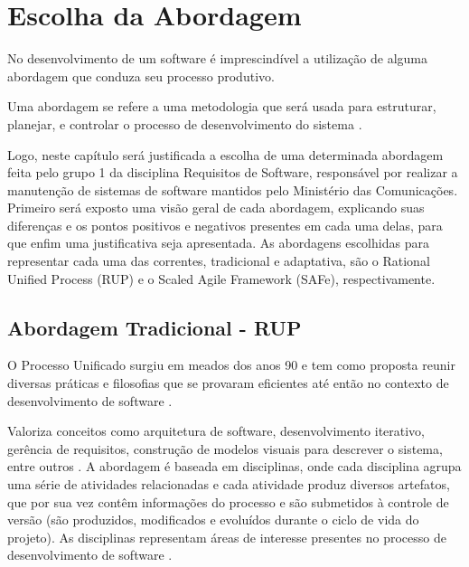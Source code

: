 \chapter[Escolha da Abordagem]{Escolha da Abordagem}
No desenvolvimento de um software é imprescindível a utilização de alguma abordagem que conduza seu processo produtivo.

Uma abordagem se refere a uma metodologia que será usada para estruturar, planejar, e controlar o processo de desenvolvimento do sistema \cite{CMS001}.

Logo, neste capítulo será justificada a escolha de uma determinada abordagem feita pelo grupo 1 da disciplina Requisitos de Software, responsável por realizar a manutenção de sistemas de software mantidos pelo Ministério das Comunicações. Primeiro será exposto uma visão geral de cada abordagem, explicando suas diferenças e os pontos positivos e negativos presentes em cada uma delas, para que enfim uma justificativa seja apresentada. As abordagens escolhidas para representar cada uma das correntes, tradicional e adaptativa, são o Rational Unified Process (RUP) e o Scaled Agile Framework (SAFe), respectivamente.

\section{Abordagem Tradicional - RUP}
O Processo Unificado surgiu em meados dos anos 90 e tem como proposta reunir diversas práticas e filosofias que se provaram eficientes até então no contexto de desenvolvimento de software \cite{kruchten001}.

Valoriza conceitos como arquitetura de software, desenvolvimento iterativo, gerência de requisitos, construção de modelos visuais para descrever o sistema, entre outros \cite{kruchten001}. A abordagem é baseada em disciplinas, onde cada disciplina agrupa uma série de atividades relacionadas e cada atividade produz diversos artefatos, que por sua vez contêm informações do processo e são submetidos à controle de versão (são produzidos, modificados e evoluídos durante o ciclo de vida do projeto). As disciplinas representam áreas de interesse presentes no processo de desenvolvimento de software \cite{kruchten001}.

